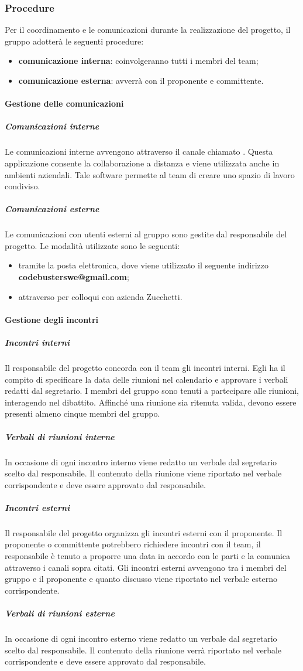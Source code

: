 \subsubsection{Procedure}
Per il coordinamento e le comunicazioni durante la realizzazione del progetto, il gruppo adotterà le seguenti procedure: 
\begin{itemize}
\item\textbf{comunicazione interna}: coinvolgeranno tutti i membri del team;
\item\textbf{comunicazione esterna}: avverrà con il proponente e committente.
\end{itemize}

\paragraph{Gestione delle comunicazioni}

\subparagraph{Comunicazioni interne}
Le comunicazioni interne avvengono attraverso il canale chiamato . Questa applicazione consente la collaborazione a distanza e viene utilizzata anche in ambienti aziendali. Tale software permette al team di creare uno spazio di lavoro condiviso.
\subparagraph{Comunicazioni esterne}
Le comunicazioni con utenti esterni al gruppo sono gestite dal responsabile del progetto. Le modalità utilizzate sono le seguenti: 
\begin{itemize}
\item tramite la posta elettronica, dove viene utilizzato il seguente indirizzo \textbf{codebusterswe@gmail.com}; 
\item attraverso  per colloqui con azienda Zucchetti.
\end{itemize} 
\paragraph{Gestione degli incontri}
\subparagraph{Incontri interni}
Il responsabile del progetto concorda con il team gli incontri interni. Egli ha il compito di specificare la data delle riunioni nel calendario e approvare i verbali redatti dal segretario. I membri del gruppo sono tenuti a partecipare alle riunioni, interagendo nel dibattito. Affinché una riunione sia ritenuta valida, devono essere presenti almeno cinque membri del gruppo.
\subparagraph{Verbali di riunioni interne}
In occasione di ogni incontro interno viene redatto un verbale dal segretario scelto dal responsabile. Il contenuto della riunione viene riportato nel verbale corrispondente e deve essere approvato dal responsabile.
\subparagraph{Incontri esterni}
Il responsabile del progetto organizza gli incontri esterni con il proponente. Il proponente o committente potrebbero richiedere incontri con il team, il responsabile è tenuto a proporre una data in accordo con le parti e la comunica attraverso i canali sopra citati.
Gli incontri esterni avvengono tra i membri del gruppo e il proponente e quanto discusso viene riportato nel verbale esterno corrispondente.
\subparagraph{Verbali di riunioni esterne}
In occasione di ogni incontro esterno viene redatto un verbale dal segretario scelto dal responsabile. Il contenuto della riunione verrà riportato nel verbale corrispondente e deve essere approvato dal responsabile.

